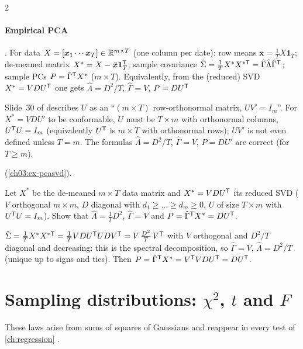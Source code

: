 \begin{paracol}{2}
\paragraph{Empirical PCA} . For data $X=[\bm x_1\cdots\bm x_T]\in\mathbb{R}^{m\times T}$ (one column per
date): row means $\bar{\bm x}=\frac1TX\bm1_T$; de-meaned matrix $X^*=X-\bar{\bm x}\bm1_T^{\mathsf T}$; sample covariance
$\hat\Sigma=\frac1TX^*X^{*\mathsf T}=\hat\Gamma\hat\Lambda\hat\Gamma^{\mathsf T}$; sample PCs $P=\hat\Gamma^{\mathsf T} X^*$ ($m\times T$). Equivalently, from the
(reduced) SVD $X^*=VDU^{\mathsf T}$ one gets $\hat\Lambda=D^2/T$, $\hat\Gamma=V$, $P=DU^{\mathsf T}$\begin{coursenote}
Slide~30 of  describes $U$ as an ``$(m\times T)$ row-orthonormal matrix, $UV'=I_m$''. For $X^*=VDU'$ to be
conformable, $U$ must be $T\times m$ with orthonormal columns, $U^{\mathsf T} U=I_m$ (equivalently $U^{\mathsf T}$ is $m\times T$ with
orthonormal rows); $UV'$ is not even defined unless $T=m$. The formulas $\hat\Lambda=D^2/T$, $\hat\Gamma=V$, $P=DU'$ are
correct (for $T\ge m$).
\end{coursenote}  (\cref{ch03:ex-pcasvd}).

\begin{exercise}\label{ch03:ex-pcasvd}
Let $X^*$ be the de-meaned $m\times T$ data matrix and $X^*=VDU^{\mathsf T}$ its reduced SVD ($V$ orthogonal $m\times m$, $D$ diagonal
with $d_1\ge\dots\ge d_m\ge0$, $U$ of size $T\times m$ with $U^{\mathsf T} U=I_m$). Show that $\hat\Lambda=\frac1TD^2$, $\hat\Gamma=V$ and
$P=\hat\Gamma^{\mathsf T} X^*=DU^{\mathsf T}$.
\end{exercise}
\begin{solution}[ch03:ex-pcasvd]
$\hat\Sigma=\frac1TX^*X^{*\mathsf T}=\frac1TVDU^{\mathsf T} UDV^{\mathsf T}=V\,\frac{D^2}T\,V^{\mathsf T}$ with $V$ orthogonal and $D^2/T$ diagonal and decreasing: this is the
spectral decomposition, so $\hat\Gamma=V$, $\hat\Lambda=D^2/T$ (unique up to signs and ties). Then $P=\hat\Gamma^{\mathsf T} X^*=V^{\mathsf T} VDU^{\mathsf T}=DU^{\mathsf T}$.
\end{solution}

\section{Sampling distributions: \texorpdfstring{$\chi^2$}{chi-square}, \texorpdfstring{$t$}{t} and \texorpdfstring{$F$}{F}}\label{ch03:sec-chisq}

These laws arise from sums of squares of Gaussians and reappear in every test of \cref{ch:regression}
.


\end{paracol}
